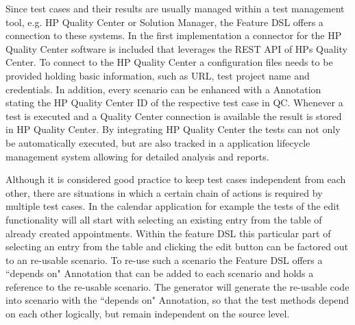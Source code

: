 \documentclass{sig-alternate-05-2015}
\begin{document}
{Since test cases and their results are usually managed within a test management tool, e.g. HP Quality Center or Solution Manager, the Feature DSL offers a connection to these systems.
In the first implementation a connector for the HP Quality Center software is included that leverages the REST API of HPs Quality Center.
To connect to the HP Quality Center a configuration files needs to be provided holding basic information, such as URL, test project name and credentials.
In addition, every scenario can be enhanced with a Annotation stating the HP Quality Center ID of the respective test case in QC.
Whenever a test is executed and a Quality Center connection is available the result is stored in HP Quality Center.
By integrating HP Quality Center the tests can not only be automatically executed, but are also tracked in a application lifecycle management system allowing for detailed analysis and reports.

Although it is considered good practice to keep test cases independent from each other, there are situations in which a certain chain of actions is required by multiple test cases.
In the calendar application for example the tests of the edit functionality will all start with selecting an existing entry from the table of already created appointments.
Within the feature DSL this particular part of selecting an entry from the table and clicking the edit button can be factored out to an re-usable scenario.
To re-use such a scenario the Feature DSL offers a ``depends on" Annotation that can be added to each scenario and holds a reference to the re-usable scenario.
The generator will generate the re-usable code into scenario with the ``depends on" Annotation, so that the test methods depend on each other logically, but remain independent on the source level.

}
\end{document}
